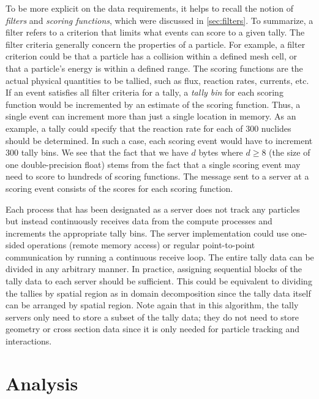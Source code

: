 To be more explicit on the data requirements, it helps to recall the notion of
\emph{filters} and \emph{scoring functions}, which were discussed in
\autoref{sec:filters}. To summarize, a filter refers to a criterion that limits
what events can score to a given tally. The filter criteria generally concern
the properties of a particle. For example, a filter criterion could be that a
particle has a collision within a defined mesh cell, or that a particle's energy
is within a defined range. The scoring functions are the actual physical
quantities to be tallied, such as flux, reaction rates, currents, etc. If an
event satisfies all filter criteria for a tally, a \emph{tally bin} for each
scoring function would be incremented by an estimate of the scoring
function. Thus, a single event can increment more than just a single location in
memory. As an example, a tally could specify that the reaction rate for each of
300 nuclides should be determined. In such a case, each scoring event would have
to increment 300 tally bins. We see that the fact that we have $d$ bytes where
$d \ge 8$ (the size of one double-precision float) stems from the fact that a
single scoring event may need to score to hundreds of scoring functions. The
message sent to a server at a scoring event consists of the scores for each
scoring function.

Each process that has been designated as a server does not track any particles
but instead continuously receives data from the compute processes and increments
the appropriate tally bins. The server implementation could use one-sided
operations (remote memory access) or regular point-to-point communication by
running a continuous receive loop. The entire tally data can be divided in any
arbitrary manner. In practice, assigning sequential blocks of the tally data to
each server should be sufficient. This could be equivalent to dividing the
tallies by spatial region as in domain decomposition since the tally data itself
can be arranged by spatial region. Note again that in this algorithm, the tally
servers only need to store a subset of the tally data; they do not need to store
geometry or cross section data since it is only needed for particle tracking and
interactions.

\section{Analysis}
\label{sec:tally-server-analysis}

